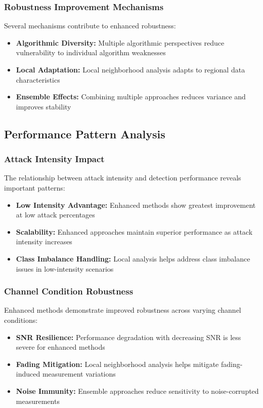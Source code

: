 \subsubsection{Robustness Improvement Mechanisms}
Several mechanisms contribute to enhanced robustness:
\begin{itemize}
\item \textbf{Algorithmic Diversity:} Multiple algorithmic perspectives reduce vulnerability to individual algorithm weaknesses
\item \textbf{Local Adaptation:} Local neighborhood analysis adapts to regional data characteristics
\item \textbf{Ensemble Effects:} Combining multiple approaches reduces variance and improves stability
\end{itemize}

\subsection{Performance Pattern Analysis}

\subsubsection{Attack Intensity Impact}
The relationship between attack intensity and detection performance reveals important patterns:
\begin{itemize}
\item \textbf{Low Intensity Advantage:} Enhanced methods show greatest improvement at low attack percentages
\item \textbf{Scalability:} Enhanced approaches maintain superior performance as attack intensity increases
\item \textbf{Class Imbalance Handling:} Local analysis helps address class imbalance issues in low-intensity scenarios
\end{itemize}

\subsubsection{Channel Condition Robustness}
Enhanced methods demonstrate improved robustness across varying channel conditions:
\begin{itemize}
\item \textbf{SNR Resilience:} Performance degradation with decreasing SNR is less severe for enhanced methods
\item \textbf{Fading Mitigation:} Local neighborhood analysis helps mitigate fading-induced measurement variations
\item \textbf{Noise Immunity:} Ensemble approaches reduce sensitivity to noise-corrupted measurements
\end{itemize}

